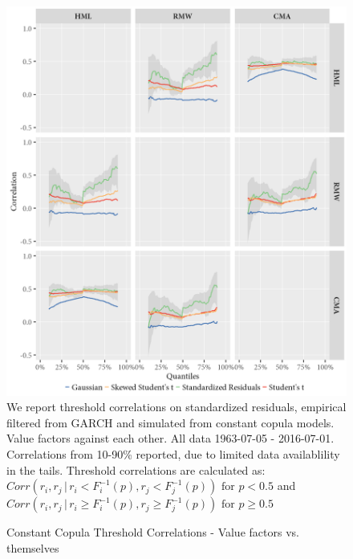 \begin{figure}[H]
  \caption{Constant Copula Threshold Correlations - Value factors vs. themselves}
  \label{diag:thresholdvalue_copula}
  \toprule
  \centering
  \begin{minipage}{\textwidth}
  \includegraphics[scale=1]{graphics/threshold_Value_copula.png}  
  \bottomrule
  \vspace{3mm}
  \footnotesize
  We report threshold correlations on standardized residuals, empirical filtered from GARCH and simulated from constant copula models. Value factors against each other. All data 1963-07-05 - 2016-07-01. Correlations from 10-90\% reported, due to limited data availablility in the tails. Threshold correlations are calculated as: $Corr(r_i, r_j \,|\, r_i < F_i^{-1}(p), r_j < F_j^{-1}(p)) \text{ for } p < 0.5$ and $Corr(r_i, r_j \,|\, r_i \geq F_i^{-1}(p), r_j \geq F_j^{-1}(p)) \text{ for } p \geq 0.5$ 
  \end{minipage}
\end{figure}


